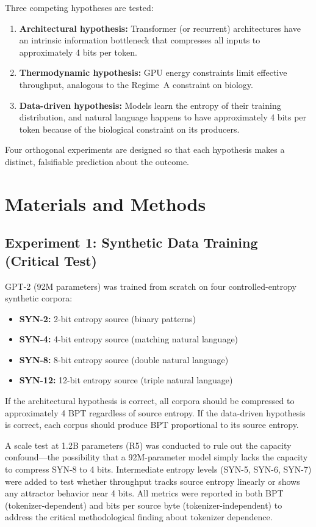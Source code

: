 \documentclass[11pt]{article}
\begin{document}
Three competing hypotheses are tested:
\begin{enumerate}
\item \textbf{Architectural hypothesis:} Transformer (or recurrent) architectures have an intrinsic information bottleneck that compresses all inputs to approximately 4 bits per token.
\item \textbf{Thermodynamic hypothesis:} GPU energy constraints limit effective throughput, analogous to the Regime~A constraint on biology.
\item \textbf{Data-driven hypothesis:} Models learn the entropy of their training distribution, and natural language happens to have approximately 4 bits per token because of the biological constraint on its producers.
\end{enumerate}

Four orthogonal experiments are designed so that each hypothesis makes a distinct, falsifiable prediction about the outcome.

\section{Materials and Methods}

\subsection{Experiment 1: Synthetic Data Training (Critical Test)}

GPT-2 (92M parameters) was trained from scratch on four controlled-entropy synthetic corpora:
\begin{itemize}
\item \textbf{SYN-2:} 2-bit entropy source (binary patterns)
\item \textbf{SYN-4:} 4-bit entropy source (matching natural language)
\item \textbf{SYN-8:} 8-bit entropy source (double natural language)
\item \textbf{SYN-12:} 12-bit entropy source (triple natural language)
\end{itemize}

If the architectural hypothesis is correct, all corpora should be compressed to approximately 4 BPT regardless of source entropy. If the data-driven hypothesis is correct, each corpus should produce BPT proportional to its source entropy.

A scale test at 1.2B parameters (R5) was conducted to rule out the capacity confound---the possibility that a 92M-parameter model simply lacks the capacity to compress SYN-8 to 4 bits. Intermediate entropy levels (SYN-5, SYN-6, SYN-7) were added to test whether throughput tracks source entropy linearly or shows any attractor behavior near 4 bits. All metrics were reported in both BPT (tokenizer-dependent) and bits per source byte (tokenizer-independent) to address the critical methodological finding about tokenizer dependence.
\end{document}
